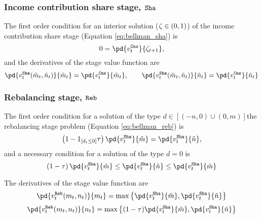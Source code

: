 \documentclass[../RiskyContrib.tex]{subfiles}
\begin{document}
\subsubsection{Income contribution share stage, $\mathtt{Sha}$}

The first order condition for an interior solution ($\zeta\in(0,1)$) of the
income contribution share stage (Equation \ref{eq:bellman_sha}) is
\begin{equation}
0 = \pd{v_t^{\Cns}}{\Contr_{t+1}},
\end{equation}
and the derivatives of the stage value function are
\begin{equation*}
\pd{v^{\Sha}_t(\tilde{m}_t, \tilde{n}_t)}{\tilde{m}_t} = \pd{v^{\Cns}_t}{\tilde{m}_t},
\qquad
\pd{v^{\Sha}_t(\tilde{m}_t, \tilde{n}_t)}{\tilde{n}_t} = \pd{v^{\Cns}_t}{\tilde{n}_t}
\end{equation*}


\subsubsection{Rebalancing stage, $\mathtt{Reb}$}

The first order condition for a solution of the type
$d\in\left[\left(-n,0\right)\cup\left(0,m\right)\right]$the rebalancing stage
problem (Equation \ref{eq:bellman_reb}) is
\begin{equation}
\left(1-1_{[d_t\leq0]}\tau\right)\pd{v_t^{\Sha}}{\tilde{m}} = \pd{v_t^{\Sha}}{\tilde{n}},
\end{equation}
and a necessary condition for a solution of the type $d=0$ is
\begin{equation}
\left(1-\tau\right)\pd{v_t^{\Sha}}{\tilde{m}} \leq \pd{v_t^{\Sha}}{\tilde{n}} \leq \pd{v_t^{\Sha}}{\tilde{m}}
\end{equation}

The derivatives of the stage value function are
\begin{equation}
\pd{v_t^{\Reb}(m_t,n_t)}{m_t} = \max \left\{ \pd{v_t^{\Sha}}{\tilde{m}}, \pd{v_t^{\Sha}}{\tilde{n}}  \right\}
\end{equation}
\begin{equation}
\pd{v_t^{\Reb}(m_t,n_t)}{n_t} = \max \left\{ (1-\tau) \pd{v_t^{\Sha}}{\tilde{m}}, \pd{v_t^{\Sha}}{\tilde{n}}  \right\}
\end{equation}
\end{document}
